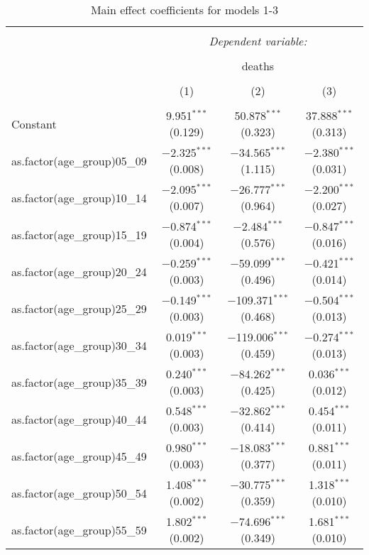 
\begin{table}[!htbp] \centering 
  \caption{Main effect coefficients for models 1-3} 
  \label{tab:pois_coefs} 
\begin{tabular}{@{\extracolsep{5pt}}lccc} 
\\[-1.8ex]\hline 
\hline \\[-1.8ex] 
 & \multicolumn{3}{c}{\textit{Dependent variable:}} \\ 
\cline{2-4} 
\\[-1.8ex] & \multicolumn{3}{c}{deaths} \\ 
\\[-1.8ex] & (1) & (2) & (3)\\ 
\hline \\[-1.8ex] 
 Constant & 9.951$^{***}$ (0.129) & 50.878$^{***}$ (0.323) & 37.888$^{***}$ (0.313) \\ 
  as.factor(age\_group)05\_09 & $-$2.325$^{***}$ (0.008) & $-$34.565$^{***}$ (1.115) & $-$2.380$^{***}$ (0.031) \\ 
  as.factor(age\_group)10\_14 & $-$2.095$^{***}$ (0.007) & $-$26.777$^{***}$ (0.964) & $-$2.200$^{***}$ (0.027) \\ 
  as.factor(age\_group)15\_19 & $-$0.874$^{***}$ (0.004) & $-$2.484$^{***}$ (0.576) & $-$0.847$^{***}$ (0.016) \\ 
  as.factor(age\_group)20\_24 & $-$0.259$^{***}$ (0.003) & $-$59.099$^{***}$ (0.496) & $-$0.421$^{***}$ (0.014) \\ 
  as.factor(age\_group)25\_29 & $-$0.149$^{***}$ (0.003) & $-$109.371$^{***}$ (0.468) & $-$0.504$^{***}$ (0.013) \\ 
  as.factor(age\_group)30\_34 & 0.019$^{***}$ (0.003) & $-$119.006$^{***}$ (0.459) & $-$0.274$^{***}$ (0.013) \\ 
  as.factor(age\_group)35\_39 & 0.240$^{***}$ (0.003) & $-$84.262$^{***}$ (0.425) & 0.036$^{***}$ (0.012) \\ 
  as.factor(age\_group)40\_44 & 0.548$^{***}$ (0.003) & $-$32.862$^{***}$ (0.414) & 0.454$^{***}$ (0.011) \\ 
  as.factor(age\_group)45\_49 & 0.980$^{***}$ (0.003) & $-$18.083$^{***}$ (0.377) & 0.881$^{***}$ (0.011) \\ 
  as.factor(age\_group)50\_54 & 1.408$^{***}$ (0.002) & $-$30.775$^{***}$ (0.359) & 1.318$^{***}$ (0.010) \\ 
  as.factor(age\_group)55\_59 & 1.802$^{***}$ (0.002) & $-$74.696$^{***}$ (0.349) & 1.681$^{***}$ (0.010) \\ 

\end{tabular}
\end{table}

